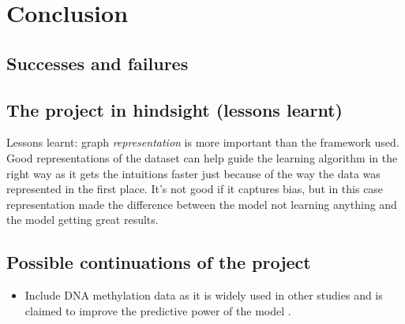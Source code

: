 \chapter{Conclusion}


\section{Successes and failures}

\section{The project in hindsight (lessons learnt)}
Lessons learnt: graph \textit{representation} is more important than the framework used. Good representations of the dataset can help guide the learning algorithm in the right way as it gets the intuitions faster just because of the way the data was represented in the first place. It's not good if it captures bias, but in this case representation made the difference between the model not learning anything and the model getting great results.

\section{Possible continuations of the project}
\begin{itemize}
    \item Include DNA methylation data as it is widely used in other studies and is claimed to improve the predictive power of the model \cite{cole2018brain}.
\end{itemize}
